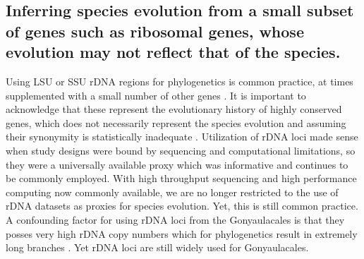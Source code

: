\documentclass[12pt]{article}
\begin{document}
\subsection*{Inferring species evolution from a small subset of genes such as ribosomal genes, whose evolution may not reflect that of the species.}
\FloatBarrier 
Using LSU or SSU rDNA regions for phylogenetics is common practice, at times supplemented with a small number of other genes \cite{shalchian2006combined,zhang2007three,saldarriaga2004molecular,murray2005improving,hoppenrath2010dinoflagellate}. 
It is important to acknowledge that these represent the evolutionary history of highly conserved genes, which does not necessarily represent the species evolution and assuming their synonymity is statistically inadequate \cite{degnan2009gene}.
Utilization of rDNA loci made sense when study designs were bound by sequencing and computational limitations, so they were a universally available proxy which was informative and continues to be commonly employed. 
With high throughput sequencing and high performance computing now commonly available, we are no longer restricted to the use of rDNA datasets as proxies for species evolution. 
Yet, this is still common practice. 
A confounding factor for using rDNA loci from the Gonyaulacales is that they posses very high rDNA copy numbers which for phylogenetics result in extremely long branches \cite{he2016reducing}. 
Yet rDNA loci are still widely used for Gonyaulacales. 
\end{document}

